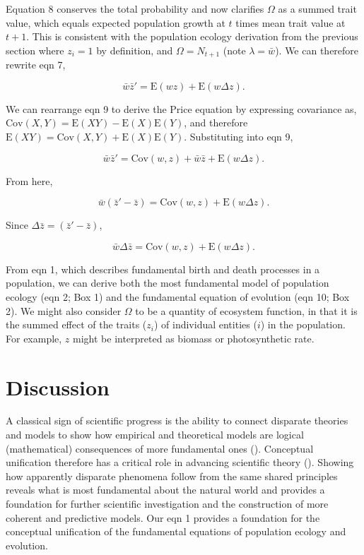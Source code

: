 \documentclass[
]{article}
\begin{document}
Equation 8 conserves the total probability and now clarifies \(\Omega\)
as a summed trait value, which equals expected population growth at
\(t\) times mean trait value at \(t + 1\). This is consistent with the
population ecology derivation from the previous section where
\(z_{i} = 1\) by definition, and \(\Omega = N_{t+1}\) (note
\(\lambda = \bar{w}\)). We can therefore rewrite eqn 7,

\[\bar{w}\bar{z}' = \mathrm{E}\left(w z \right) + \mathrm{E}\left( w \Delta z  \right).
\tag{9}
\]

We can rearrange eqn 9 to derive the Price equation by expressing
covariance as,
\(\mathrm{Cov}(X,Y) = \mathrm{E}(XY) - \mathrm{E}(X)\mathrm{E}(Y)\), and
therefore
\(\mathrm{E}(XY) = \mathrm{Cov}(X,Y) + \mathrm{E}(X)\mathrm{E}(Y)\).
Substituting into eqn 9,

\[\bar{w}\bar{z}' = \mathrm{Cov}\left(w ,z \right) + \bar{w}\bar{z} + \mathrm{E}\left( w \Delta z  \right).\]

From here,

\[\bar{w}\left(\bar{z}' - \bar{z}\right) = \mathrm{Cov}\left(w ,z \right) + \mathrm{E}\left( w \Delta z  \right).\]

Since \(\Delta \bar{z} = \left(\bar{z}' - \bar{z}\right)\),

\[\bar{w}\Delta \bar{z} = \mathrm{Cov}\left(w ,z \right) + \mathrm{E}\left( w \Delta z  \right).
\tag{10}
\]

From eqn 1, which describes fundamental birth and death processes in a
population, we can derive both the most fundamental model of population
ecology (eqn 2; Box 1) and the fundamental equation of evolution (eqn
10; Box 2). We might also consider \(\Omega\) to be a quantity of
ecosystem function, in that it is the summed effect of the traits
(\(z_{i}\)) of individual entities (\(i\)) in the population. For
example, \(z\) might be interpreted as biomass or photosynthetic rate.

\section{Discussion}\label{discussion}

A classical sign of scientific progress is the ability to connect
disparate theories and models to show how empirical and theoretical
models are logical (mathematical) consequences of more fundamental ones
(). Conceptual unification therefore
has a critical role in advancing scientific theory
(). Showing how apparently
disparate phenomena follow from the same shared principles reveals what
is most fundamental about the natural world and provides a foundation
for further scientific investigation and the construction of more
coherent and predictive models. Our eqn 1 provides a foundation for the
conceptual unification of the fundamental equations of population
ecology and evolution.
\end{document}
